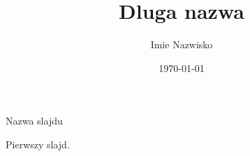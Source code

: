 \documentclass[xcolor=dvipsnames, 9pt]{beamer}
\title[Krotka nazwa]{Dluga nazwa}
\author{Imie Nazwisko}
\date{\today}
\begin{document}
\begin{frame}
\titlepage


\end{frame} 

\begin{frame}{Nazwa slajdu}

Pierwszy slajd.

\end{frame}
\end{document}
